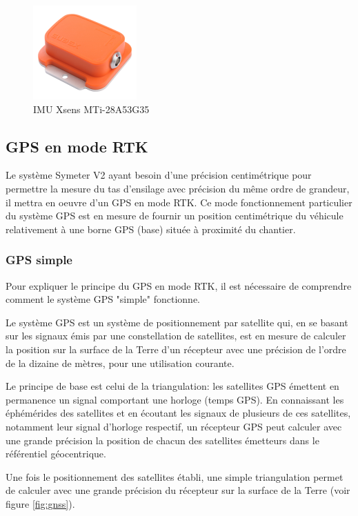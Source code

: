 \documentclass[12pt,a4paper]{report}
\begin{document}
		\begin{figure}[h!]
			\centering
			\includegraphics[width=0.3\linewidth]{img/150px-Mti}
			\caption[mti]{IMU Xsens MTi-28A53G35}
			\label{fig:150px-mti}
		\end{figure}
		
		
		\subsection{GPS en mode RTK}
		
		Le système Symeter V2 ayant besoin d'une précision centimétrique pour permettre la mesure du tas d'ensilage avec précision du même ordre de grandeur, il mettra en oeuvre d'un GPS en mode RTK. Ce mode fonctionnement particulier du système GPS est en mesure de fournir un position centimétrique du véhicule relativement à une borne GPS (base) située à proximité du chantier.
		
		\subsubsection{GPS simple}
		Pour expliquer le principe du GPS en mode RTK, il est nécessaire de comprendre comment le système GPS "simple" fonctionne. 
		
		\para Le système GPS est un système de positionnement par satellite qui, en se basant sur les signaux émis par une constellation de satellites, est en mesure de calculer la position sur la surface de la Terre d'un récepteur avec une précision de l'ordre de la dizaine de mètres, pour une utilisation courante.
		
		\para Le principe de base est celui de la triangulation: les satellites GPS émettent en permanence un signal comportant une horloge (temps GPS). En connaissant les éphémérides des satellites et en écoutant les signaux de plusieurs de ces satellites, notamment leur signal d'horloge respectif, un récepteur GPS peut calculer avec une grande précision la position de chacun des satellites émetteurs dans le référentiel géocentrique.
		
		\para Une fois le positionnement des satellites établi, une simple triangulation permet de calculer avec une grande précision du récepteur sur la surface de la Terre (voir figure \ref{fig:gnss}).
		
\end{document}
